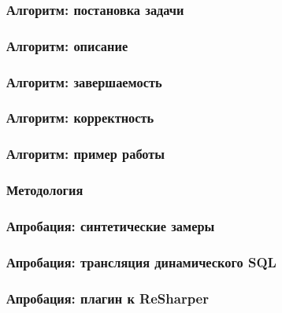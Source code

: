 \documentclass{beamer}
\begin{document}
\begin{frame}
	\transwipe[direction=90]
	\frametitle{Алгоритм: постановка задачи}
\end{frame}

\begin{frame}
	\transwipe[direction=90]
	\frametitle{Алгоритм: описание}
\end{frame}

\begin{frame}
	\transwipe[direction=90]
	\frametitle{Алгоритм: завершаемость}
	\begin{theorem}


	\end{theorem}
\end{frame}

\begin{frame}
	\transwipe[direction=90]
	\frametitle{Алгоритм: корректность}
	\begin{theorem}


	\end{theorem}

	\begin{theorem}


	\end{theorem}

\end{frame}

\begin{frame}
	\transwipe[direction=90]
	\frametitle{Алгоритм: пример работы}
\end{frame}

\begin{frame}[t]
	\transwipe[direction=90]
	\frametitle{Методология}
\end{frame}

\begin{frame}[t]
	\transwipe[direction=90]
	\frametitle{Апробация: синтетические замеры}
\end{frame}

\begin{frame}[t]
	\transwipe[direction=90]
	\frametitle{Апробация: трансляция динамического SQL}
\end{frame}

\begin{frame}[t]
	\transwipe[direction=90]
	\frametitle{Апробация: плагин к ReSharper}
\end{frame}
\end{document}
